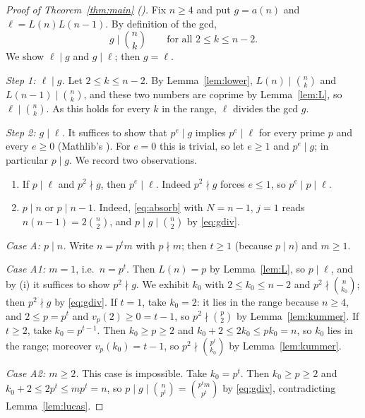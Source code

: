 \documentclass[11pt]{amsart}
\theoremstyle{plain}
\theoremstyle{definition}
\begin{document}
\begin{proof}[Proof of Theorem~\ref{thm:main} ()]
Fix $n\ge4$ and put $g=a(n)$ and $\ell=L(n)L(n-1)$. By definition of the gcd,
\begin{equation}\label{eq:gdiv}
  g\mid\binom nk\qquad\text{for all }2\le k\le n-2 .
\end{equation}
We show $\ell\mid g$ and $g\mid\ell$; then $g=\ell$.

\emph{Step 1: $\ell\mid g$.} Let $2\le k\le n-2$. By Lemma~\ref{lem:lower}, $L(n)\mid\binom nk$ and $L(n-1)\mid\binom nk$, and these two numbers are coprime by Lemma~\ref{lem:L}, so $\ell\mid\binom nk$. As this holds for every $k$ in the range, $\ell$ divides the gcd $g$.

\emph{Step 2: $g\mid\ell$.} It suffices to show that $p^e\mid g$ implies $p^e\mid\ell$ for every prime $p$ and every $e\ge0$ (Mathlib's ). For $e=0$ this is trivial, so let $e\ge1$ and $p^e\mid g$; in particular $p\mid g$. We record two observations.
\begin{enumerate}
\item[(i)] If $p\mid\ell$ and $p^2\nmid g$, then $p^e\mid\ell$. Indeed $p^2\nmid g$ forces $e\le1$, so $p^e\mid p\mid\ell$.
\item[(ii)] $p\mid n$ or $p\mid n-1$. Indeed, \eqref{eq:absorb} with $N=n-1$, $j=1$ reads $n(n-1)=2\binom n2$, and $p\mid g\mid\binom n2$ by \eqref{eq:gdiv}.
\end{enumerate}

\emph{Case A: $p\mid n$.} Write $n=p^tm$ with $p\nmid m$; then $t\ge1$ (because $p\mid n$) and $m\ge1$.

\emph{Case A1: $m=1$}, i.e.\ $n=p^t$. Then $L(n)=p$ by Lemma~\ref{lem:L}, so $p\mid\ell$, and by (i) it suffices to show $p^2\nmid g$. We exhibit $k_0$ with $2\le k_0\le n-2$ and $p^2\nmid\binom n{k_0}$; then $p^2\nmid g$ by \eqref{eq:gdiv}.
If $t=1$, take $k_0=2$: it lies in the range because $n\ge4$, and $2\le p=p^t$ and $v_p(2)\ge0=t-1$, so $p^2\nmid\binom p2$ by Lemma~\ref{lem:kummer}.
If $t\ge2$, take $k_0=p^{t-1}$. Then $k_0\ge p\ge2$ and $k_0+2\le 2k_0\le pk_0=n$, so $k_0$ lies in the range; moreover $v_p(k_0)=t-1$, so $p^2\nmid\binom{p^t}{k_0}$ by Lemma~\ref{lem:kummer}.

\emph{Case A2: $m\ge2$.} This case is impossible. Take $k_0=p^t$. Then $k_0\ge p\ge2$ and $k_0+2\le2p^t\le mp^t=n$, so $p\mid g\mid\binom n{p^t}=\binom{p^tm}{p^t}$ by \eqref{eq:gdiv}, contradicting Lemma~\ref{lem:lucas}.


\end{proof}
\end{document}
